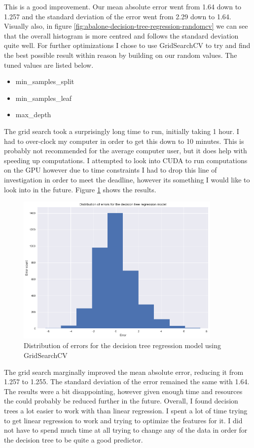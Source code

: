 This is a good improvement. Our mean absolute error went from 1.64 down to 1.257 and the standard deviation of the error went from 2.29 down to 1.64. Visually also, in figure \ref{fig:abalone-decision-tree-regression-randomcv} we can see that the overall histogram is more centred and follows the standard deviation quite well. 
For further optimizations I chose to use GridSearchCV to try and find the best possible result within reason by building on our random values. The tuned values are listed below.

\begin{itemize}
  \item min\_samples\_split
  \item min\_samples\_leaf
  \item max\_depth
\end{itemize}

The grid search took a surprisingly long time to run, initially taking 1 hour. I had to over-clock my computer in order to get this down to 10 minutes. This is probably not recommended for the average computer user, but it does help with speeding up computations. I attempted to look into CUDA to run computations on the GPU\cite{6024507} however due to time constraints I had to drop this line of investigation in order to meet the deadline, however its something I would like to look into in the future. Figure \ref{fig:abalone-decision-tree-regression-gridcv} shows the results. 

\begin{figure}[H]
  \centering
  \includegraphics[scale=0.5,width=100mm]{./images/abalone-decision-tree-regression-gridcv.png}
  \caption{Distribution of errors for the decision tree regression model using GridSearchCV}
  \label{fig:abalone-decision-tree-regression-gridcv}
\end{figure}

The grid search marginally improved the mean absolute error, reducing it from 1.257 to 1.255. The standard deviation of the error remained the same with 1.64. The results were a bit disappointing, however given enough time and resources the could probably be reduced further in the future.
Overall, I found decision trees a lot easier to work with than linear regression. I spent a lot of time trying to get linear regression to work and trying to optimize the features for it. I did not have to spend much time at all trying to change any of the data in order for the decision tree to be quite a good predictor.